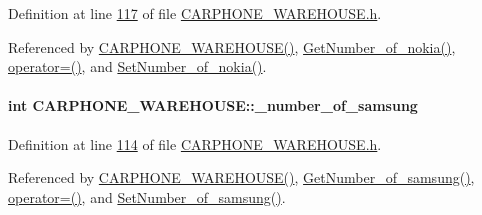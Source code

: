 Definition at line \hyperlink{_c_a_r_p_h_o_n_e___w_a_r_e_h_o_u_s_e_8h_source_l00117}{117} of file \hyperlink{_c_a_r_p_h_o_n_e___w_a_r_e_h_o_u_s_e_8h_source}{C\+A\+R\+P\+H\+O\+N\+E\+\_\+\+W\+A\+R\+E\+H\+O\+U\+S\+E.\+h}.



Referenced by \hyperlink{_c_a_r_p_h_o_n_e___w_a_r_e_h_o_u_s_e_8h_source_l00024}{C\+A\+R\+P\+H\+O\+N\+E\+\_\+\+W\+A\+R\+E\+H\+O\+U\+S\+E()}, \hyperlink{_c_a_r_p_h_o_n_e___w_a_r_e_h_o_u_s_e_8cpp_source_l00079}{Get\+Number\+\_\+of\+\_\+nokia()}, \hyperlink{_c_a_r_p_h_o_n_e___w_a_r_e_h_o_u_s_e_8h_source_l00075}{operator=()}, and \hyperlink{_c_a_r_p_h_o_n_e___w_a_r_e_h_o_u_s_e_8cpp_source_l00075}{Set\+Number\+\_\+of\+\_\+nokia()}.

\paragraph[{\texorpdfstring{\+\_\+number\+\_\+of\+\_\+samsung}{_number_of_samsung}}]{\setlength{\rightskip}{0pt plus 5cm}int C\+A\+R\+P\+H\+O\+N\+E\+\_\+\+W\+A\+R\+E\+H\+O\+U\+S\+E\+::\+\_\+number\+\_\+of\+\_\+samsung\hspace{0.3cm}{\ttfamily [private]}}\hypertarget{class_c_a_r_p_h_o_n_e___w_a_r_e_h_o_u_s_e_a6ee4003dc7303c7df17f67a26556bdf0_a6ee4003dc7303c7df17f67a26556bdf0}{}\label{class_c_a_r_p_h_o_n_e___w_a_r_e_h_o_u_s_e_a6ee4003dc7303c7df17f67a26556bdf0_a6ee4003dc7303c7df17f67a26556bdf0}


Definition at line \hyperlink{_c_a_r_p_h_o_n_e___w_a_r_e_h_o_u_s_e_8h_source_l00114}{114} of file \hyperlink{_c_a_r_p_h_o_n_e___w_a_r_e_h_o_u_s_e_8h_source}{C\+A\+R\+P\+H\+O\+N\+E\+\_\+\+W\+A\+R\+E\+H\+O\+U\+S\+E.\+h}.



Referenced by \hyperlink{_c_a_r_p_h_o_n_e___w_a_r_e_h_o_u_s_e_8h_source_l00024}{C\+A\+R\+P\+H\+O\+N\+E\+\_\+\+W\+A\+R\+E\+H\+O\+U\+S\+E()}, \hyperlink{_c_a_r_p_h_o_n_e___w_a_r_e_h_o_u_s_e_8cpp_source_l00103}{Get\+Number\+\_\+of\+\_\+samsung()}, \hyperlink{_c_a_r_p_h_o_n_e___w_a_r_e_h_o_u_s_e_8h_source_l00075}{operator=()}, and \hyperlink{_c_a_r_p_h_o_n_e___w_a_r_e_h_o_u_s_e_8cpp_source_l00099}{Set\+Number\+\_\+of\+\_\+samsung()}.


